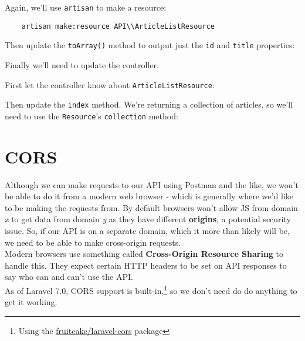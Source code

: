 Again, we'll use \texttt{artisan} to make a resource:

\begin{verbatim}
    artisan make:resource API\\ArticleListResource
\end{verbatim}

Then update the \texttt{toArray()} method to output just the \texttt{id} and \texttt{title} properties:


Finally we'll need to update the controller.

\pagebreak

First let the controller know about \texttt{ArticleListResource}:


Then update the \texttt{index} method. We're returning a collection of articles, so we'll need to use the \texttt{Resource}'s \texttt{collection} method:




\section{CORS}

Although we can make requests to our API using Postman and the like, we won't be able to do it from a modern web browser - which is generally where we'd like to be making the requests from. By default browsers won't allow JS from domain \textit{x} to get data from domain \textit{y} as they have different \textbf{origins}, a potential security issue. So, if our API is on a separate domain, which it more than likely will be, we need to be able to make cross-origin requests.
\\

Modern browsers use something called \textbf{Cross-Origin Resource Sharing} to handle this. They expect certain HTTP headers to be set on API responses to say who can and can't use the API.
\\

As of Laravel 7.0, CORS support is built-in,\footnote{Using the  \href{https://github.com/fruitcake/laravel-cors}{fruitcake/laravel-cors} package} so we don't need do do anything to get it working.
\\

